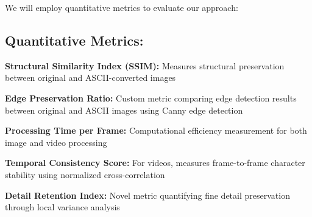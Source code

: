 \documentclass[10pt,twocolumn,letterpaper]{article}
\begin{document}
We will employ quantitative metrics to evaluate our approach:

\subsection{Quantitative Metrics:}

\textbf{Structural Similarity Index (SSIM):} Measures structural preservation between original and ASCII-converted images

\textbf{Edge Preservation Ratio:} Custom metric comparing edge detection results between original and ASCII images using Canny edge detection

\textbf{Processing Time per Frame:} Computational efficiency measurement for both image and video processing

\textbf{Temporal Consistency Score:} For videos, measures frame-to-frame character stability using normalized cross-correlation

\textbf{Detail Retention Index:} Novel metric quantifying fine detail preservation through local variance analysis


{\small


}
\end{document}
